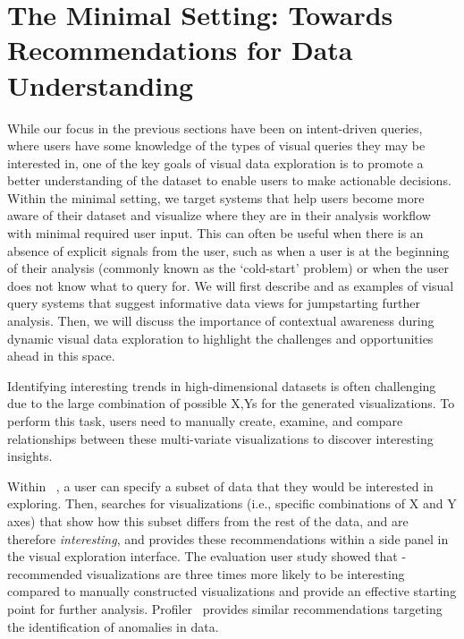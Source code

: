 \section{The Minimal Setting: Towards Recommendations for Data Understanding}\label{sec:minimal}
\par While our focus in the previous sections 
have been on intent-driven queries, 
where users have some knowledge 
of the types of visual queries they may be interested in, 
one of the key goals of visual data exploration 
is to promote a better understanding of the dataset 
to enable users to make actionable decisions. 
Within the minimal setting, we target
systems that help users become more 
aware of their dataset and visualize 
where they are in their analysis workflow 
with minimal required user input. 
This can often be useful when 
there is an absence of explicit signals from the user, 
such as when a user is at the 
beginning of their analysis 
(commonly known as the `cold-start' problem) 
or when the user does not know what to query for. 
We will first describe \seedb and \sbd as 
examples of visual query systems 
that suggest informative data views 
for jumpstarting further analysis. 
Then, we will discuss the importance 
of contextual awareness during dynamic visual data exploration to highlight the challenges and opportunities ahead in this space.

\smallskip
{}
Identifying interesting trends in 
high-dimensional datasets is often challenging 
due to the large combination of possible X,Ys 
for the generated visualizations. 
To perform this task, users need to manually create, examine, and compare relationships between these multi-variate visualizations 
to discover interesting insights. 

\par Within \seedb~\cite{Vartak2015},
a user can specify a subset of data 
that they would be interested in exploring. 
Then, \seedb searches for visualizations
(i.e., specific combinations of X and Y axes)
that show how this subset differs from the rest 
of the data, and are
therefore {\em interesting},
and provides these recommendations within a side panel
in the visual exploration interface.
The evaluation user study showed that 
\seedb-recommended visualizations are 
three times more likely to be interesting 
compared to manually constructed visualizations 
and provide an effective starting point for further analysis.
Profiler~\cite{Kandel2012} provides similar
recommendations targeting the identification of
anomalies in data.


